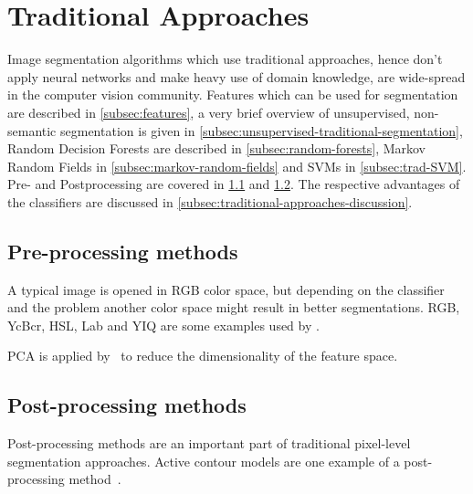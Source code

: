 
\newcommand\independent{\protect\mathpalette{\protect\independenT}{\perp}}
\def\independenT#1#2{\mathrel{\rlap{$#1#2$}\mkern2mu{#1#2}}}

\section{Traditional Approaches}\label{sec:traditional-approaches}%
Image segmentation algorithms which use traditional approaches, hence don't
apply neural networks and make heavy use of domain knowledge, are wide-spread
in the computer vision community. Features which can be used for segmentation
are described in \cref{subsec:features}, a very brief overview of unsupervised,
non-semantic segmentation is given in
\cref{subsec:unsupervised-traditional-segmentation}, Random Decision
Forests are described in \cref{subsec:random-forests}, Markov Random Fields in
\cref{subsec:markov-random-fields} and \glspl{SVM} in
\cref{subsec:trad-SVM}.
Pre- and Postprocessing are covered in \cref{subsec:preprocessing-methods} and
\cref{subsec:post-processing-methods}. The respective advantages of the
classifiers are discussed in \cref{subsec:traditional-approaches-discussion}.








\subsection{Pre-processing methods}\label{subsec:preprocessing-methods}%
A typical image is opened in RGB color space, but depending on the classifier
and the problem another color space might result in better segmentations. RGB,
YcBcr, HSL, Lab and YIQ are some examples used by \cite{cohen2015memory}.

\Gls{PCA} is applied by~\cite{chen2011pixel} to reduce the dimensionality of
the feature space.

\subsection{Post-processing methods}%
\label{subsec:post-processing-methods}%
Post-processing methods are an important part of traditional pixel-level
segmentation approaches. Active contour models are one example of a
post-processing method~\cite{kass1988snakes}.


